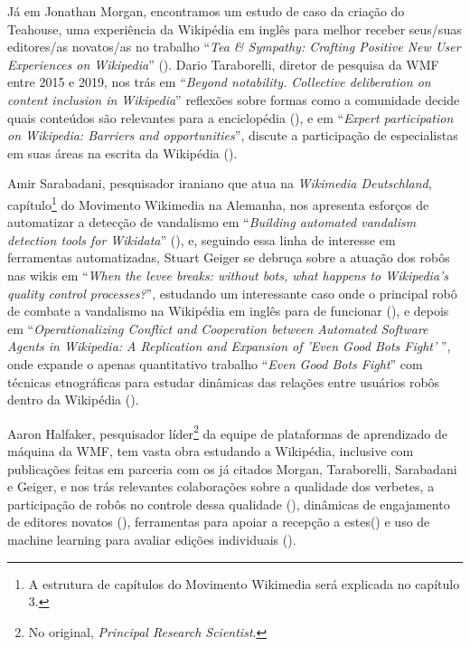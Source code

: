 Já em Jonathan Morgan, encontramos um estudo de caso da criação do Teahouse, uma experiência da Wikipédia em inglês para melhor receber seus/suas editores/as novatos/as no trabalho ``\textit{Tea \& Sympathy: Crafting Positive New User Experiences on Wikipedia}'' (\cite{morgan_tea_2013}). Dario Taraborelli, diretor de pesquisa da WMF entre 2015 e 2019, nos trás em ``\textit{Beyond notability. Collective deliberation on content inclusion in Wikipedia}'' reflexões sobre formas como a comunidade decide quais conteúdos são relevantes para a enciclopédia (\cite{taraborelli_beyond_2010}), e em ``\textit{Expert participation on Wikipedia: Barriers and opportunities}'', discute a participação de especialistas em suas áreas na escrita da Wikipédia (\cite{taraborelli_expert_2011}).

Amir Sarabadani, pesquisador iraniano que atua na \textit{Wikimedia Deutschland}, capítulo\footnote{A estrutura de capítulos do Movimento Wikimedia será explicada no capítulo 3.} do Movimento Wikimedia na Alemanha, nos apresenta esforços de automatizar a detecção de vandalismo em ``\textit{Building automated vandalism detection tools for Wikidata}'' (\cite{sarabadani_building_2017}), e, seguindo essa linha de interesse em ferramentas automatizadas, Stuart Geiger se debruça sobre a atuação dos robôs nas wikis em ``\textit{When the levee breaks: without bots, what happens to Wikipedia's quality control processes?}'', estudando um interessante caso onde o principal robô de combate a vandalismo na Wikipédia em inglês para de funcionar (\cite{halfaker_rise_2013}), e depois em ``\textit{Operationalizing Conflict and Cooperation between Automated Software Agents in Wikipedia: A Replication and Expansion of 'Even Good Bots Fight' }'', onde expande o apenas quantitativo trabalho ``\textit{Even Good Bots Fight}'' com técnicas etnográficas para estudar dinâmicas das relações entre usuários robôs dentro da Wikipédia (\cite{geiger_operationalizing_2017}).

Aaron Halfaker, pesquisador líder\footnote{No original, \textit{Principal Research Scientist}.} da equipe de plataformas de aprendizado de máquina da WMF, tem vasta obra estudando a Wikipédia, inclusive com publicações feitas em parceria com os já citados Morgan, Taraborelli, Sarabadani e Geiger, e nos trás relevantes colaborações sobre a qualidade dos verbetes, a participação de robôs no controle dessa qualidade (\cite{halfaker_bots_2012}), dinâmicas de engajamento de editores novatos (\cite{halfaker_dont_2011}), ferramentas para apoiar a recepção a estes(\cite{halfaker_snuggle:_2014}) e uso de machine learning para avaliar edições individuais (\cite{halfaker_artificial_2015}).

